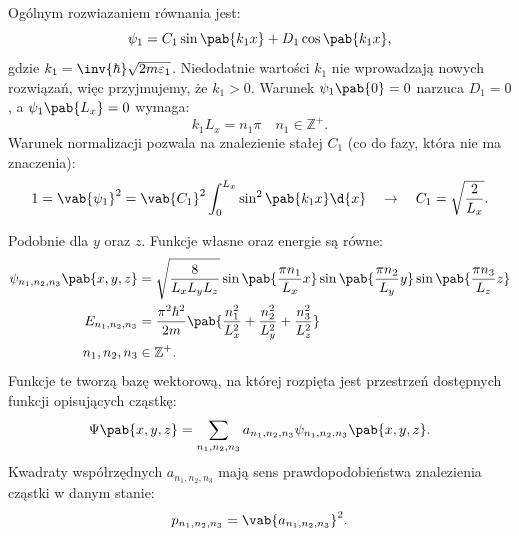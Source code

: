 Ogólnym rozwiazaniem równania jest:
\begin{equation*}
	\psi_{1} = C_{1}\sin\pab{k_{1}x} + D_{1}\cos\pab{k_{1}x},
\end{equation*}
gdzie \(k_{1} = \inv{\hbar}\sqrt{2m\varepsilon_{1}}\). Niedodatnie wartości \(k_{1}\) nie wprowadzają nowych rozwiązań, więc przyjmujemy, że \(k_{1} > 0\). Warunek \(\psi_{1}\pab{0} = 0\) narzuca \(D_{1} = 0\), a \(\psi_{1}\pab{L_{x}} = 0\) wymaga:
\begin{equation*}
	k_{1}L_{x} = n_{1}\pi \quad n_{1} \in \mathbb{Z}^{+}.
\end{equation*}
Warunek normalizacji pozwala na znalezienie stałej \(C_{1}\) (co do fazy, która nie ma znaczenia):
\begin{equation*}
	1 = \vab{\psi_1}^{2} = \vab{C_1}^{2} \int_{0}^{L_x}\sin^{2}\pab{k_{1}x} \d{x} \quad\rightarrow\quad
	C_1 = \sqrt{\frac{2}{L_x}}.
\end{equation*}

Podobnie dla \(y\) oraz \(z\). Funkcje własne oraz energie są równe:
\begin{align*}
	\psi_{n_1,n_2,n_3}\pab{x,y,z} &= \sqrt{\frac{8}{L_x L_y L_z}}\sin\pab{\frac{\pi n_1}{L_x}x}\sin\pab{\frac{\pi n_2}{L_y}y}\sin\pab{\frac{\pi n_3}{L_z}z} \\
	E_{n_1,n_2,n_3} &= \frac{\pi^2 \hbar^2}{2m} \pab{\frac{n_1^2}{L_x^2} + \frac{n_2^2}{L_y^2} + \frac{n_3^2}{L_z^2}} \\
	n_1, n_2, n_3 &\in \mathbb{Z}^{+}.
\end{align*}
Funkcje te tworzą bazę wektorową, na której rozpięta jest przestrzeń dostępnych funkcji opisujących cząstkę:
\begin{equation*}
	\Psi\pab{x,y,z} = \sum_{n_1,n_2,n_3} a_{n_1,n_2,n_3} \psi_{n_1,n_2,n_3}\pab{x,y,z}.
\end{equation*}
Kwadraty współrzędnych \(a_{n_1,n_2,n_3}\) mają sens prawdopodobieństwa znalezienia cząstki w danym stanie:
\begin{equation*}
	p_{n_1,n_2,n_3} = \vab{a_{n_1,n_2,n_3}}^2.
\end{equation*}
